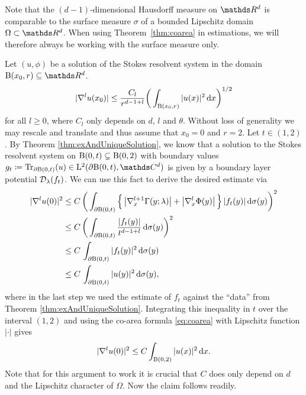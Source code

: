 Note that the $(d-1)$-dimensional Hausdorff measure on $\R^d$ is comparable to the surface measure $\sigma$ of a bounded Lipschitz domain $\Omega \subset \R^d$.
When using Theorem~\ref{thm:coarea} in estimations, we will therefore always be working with the surface measure only.

\begin{rem}
  Let $(u,\phi)$ be a solution of the Stokes resolvent system in the domain $\BB(x_0, r) \subseteq \R^d$.
  \begin{align}
    \label{eq:interiorEstimateDoubleLayer}
    |\nabla^l u(x_0) | \leq \frac{C_l}{r^{d - 1 + l}} \bigg( \int_{\mathrm{B}(x_0, r)} |u(x)|^2 \, {\operatorname{d}\!{x}} \bigg)^{1/2}
  \end{align}
  for all $l \geq 0$, where $C_l$ only depends on $d$, $l$ and $\theta$.
  Without loss of generality we may rescale and translate and thus assume that $x_0 = 0$ and $r = 2$.
  Let $t \in (1,2)$. By Theorem \ref{thm:exAndUniqueSolution}, we know that a solution to the Stokes resolvent system on $\mathrm{B}(0, t) \subsetneq \mathrm{B}(0,2)$ with boundary values $g_t \coloneqq \operatorname{Tr}_{\partial\BB(0,t)} (u) \in \Ell^2(\partial\BB(0,t),\C^d)$ is given by a boundary layer potential $\mathcal{D}_\lambda(f_t)$.
  We can use this fact to derive the desired estimate via
  \begin{align*}
    |\nabla^l u(0)|^2 
    &\leq C\, \bigg( \int_{\partial \mathrm{B}(0, t)} \Big\{ \, \big|\nabla_x^{l+1} \Gamma(y; \lambda)\big|  + \big|\nabla_x^l \Phi(y) \big| \, \Big\} \, |f_t(y)| \, {\operatorname{d}\!{\sigma}}(y)\bigg)^2 \\
    &\leq C\, \bigg( \int_{\partial \mathrm{B}(0,t)} \frac{|f_t(y)|}{t^{d - 1 + l}}  \, {\operatorname{d}\!{\sigma}}(y)\bigg)^2 \\
    &\leq C\, \int_{\partial \mathrm{B}(0,t)} |f_t(y)|^2  \, {\operatorname{d}\!{\sigma}}(y) \\
    &\leq C\, \int_{\partial \mathrm{B}(0,t)} |u(y)|^2 \, {\operatorname{d}\!{\sigma}}(y), 
  \end{align*}
  where in the last step we used the estimate of $f_t$ against the ``data'' from Theorem \ref{thm:exAndUniqueSolution}.
  Integrating this inequality in $t$ over the interval $(1,2)$ and using the co-area formula \eqref{eq:coarea} with Lipschitz function $|\cdot|$ gives 
  \begin{align*}
    |\nabla^l u(0)|^2 \leq C \int_{\mathrm{B}(0,2)} |u(x)|^2 \, {\operatorname{d}\!{x}}.
  \end{align*}
  Note that for this argument to work it is crucial that $C$ does only depend on $d$ and the Lipschitz character of $\Omega$.
  Now the claim follows readily.
\end{rem}


